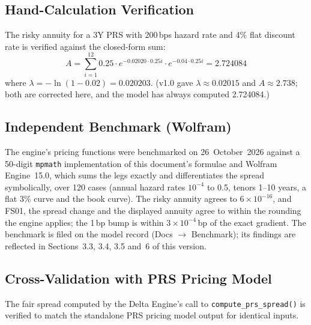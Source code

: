 \documentclass[11pt,a4paper]{article}
\begin{document}
\subsection{Hand-Calculation Verification}

The risky annuity for a 3Y PRS with 200\,bps hazard rate and 4\% flat discount rate is verified against the closed-form sum:
\begin{equation}
    A = \sum_{i=1}^{12} 0.25 \cdot e^{-0.02020 \cdot 0.25i} \cdot e^{-0.04 \cdot 0.25i} = 2.724084
\end{equation}
where $\lambda = -\ln(1 - 0.02) = 0.020203$. (v1.0 gave $\lambda\approx0.02015$ and $A\approx2.738$; both are corrected here, and the model has always computed 2.724084.)

\subsection{Independent Benchmark (Wolfram)}

The engine's pricing functions were benchmarked on 26~October~2026 against a 50-digit
\texttt{mpmath} implementation of this document's formulae and Wolfram Engine~15.0,
which sums the legs exactly and differentiates the spread symbolically, over 120 cases
(annual hazard rates $10^{-4}$ to 0.5, tenors 1--10 years, a flat 3\% curve and the
book curve). The risky annuity agrees to $6\times10^{-16}$, and FS01, the spread change
and the displayed annuity agree to within the rounding the engine applies; the 1\,bp
bump is within $3\times10^{-4}$\,bp of the exact gradient. The benchmark is filed on the
model record (Docs $\rightarrow$ Benchmark); its findings are reflected in
Sections~3.3, 3.4, 3.5 and~6 of this version.

\subsection{Cross-Validation with PRS Pricing Model}

The fair spread computed by the Delta Engine's call to \texttt{compute\_prs\_spread()} is verified to match the standalone PRS pricing model output for identical inputs.

\clearpage

\mkmlimitations
\end{document}
